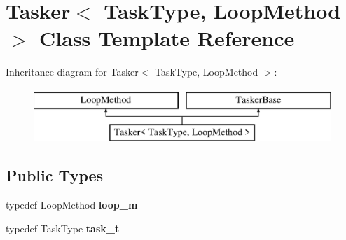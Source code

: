 \hypertarget{class_tasker}{}\section{Tasker$<$ Task\+Type, Loop\+Method $>$ Class Template Reference}
\label{class_tasker}
Inheritance diagram for Tasker$<$ Task\+Type, Loop\+Method $>$\+:\begin{figure}[H]
\begin{center}
\leavevmode
\includegraphics[height=2.000000cm]{class_tasker}
\end{center}
\end{figure}
\subsection*{Public Types}
\begin{DoxyCompactItemize}
\item 
\mbox{\label{class_tasker_a3e9340a4891ee26049746f6a37fa1d65}} 
typedef Loop\+Method {\bfseries loop\+\_\+m}
\item 
\mbox{\label{class_tasker_ace2643f69a2c9298541577a25178d6cf}} 
typedef Task\+Type {\bfseries task\+\_\+t}
\end{DoxyCompactItemize}
